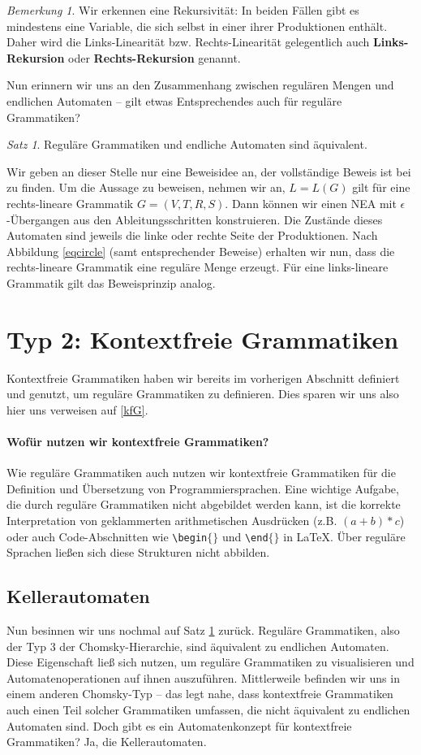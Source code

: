 \documentclass[11pt,a4paper]{scrreport}
\theoremstyle{remark}
\newtheorem{note}{Bemerkung}
\theoremstyle{custom}
\newtheorem{satz}{Satz}[section]
\begin{document}
\begin{note}
Wir erkennen eine Rekursivität: In beiden Fällen gibt es mindestens eine Variable, die sich selbst in einer ihrer Produktionen enthält. Daher wird die Links-Linearität bzw. Rechts-Linearität gelegentlich auch \textbf{Links-Rekursion} oder \textbf{Rechts-Rekursion} genannt.
\end{note}
Nun erinnern wir uns an den Zusammenhang zwischen regulären Mengen und endlichen Automaten -- gilt etwas Entsprechendes auch für reguläre Grammatiken?
\begin{satz} \label{eqSatz}
Reguläre Grammatiken und endliche Automaten sind äquivalent.
\end{satz}
Wir geben an dieser Stelle nur eine Beweisidee an, der vollständige Beweis ist bei \parencite[][S. 228]{Hopcroft} zu finden. Um die Aussage zu beweisen, nehmen wir an, $L = L(G)$ gilt für eine rechts-lineare Grammatik $G = (V, T, R, S)$. Dann können wir einen NEA mit $\epsilon$-Übergangen aus den Ableitungsschritten konstruieren. Die Zustände dieses Automaten sind jeweils die linke oder rechte Seite der Produktionen. Nach Abbildung \ref{eqcircle} (samt entsprechender Beweise) erhalten wir nun, dass die rechts-lineare Grammatik eine reguläre Menge erzeugt. Für eine links-lineare Grammatik gilt das Beweisprinzip analog.
\section{Typ 2: Kontextfreie Grammatiken}
Kontextfreie Grammatiken haben wir bereits im vorherigen Abschnitt definiert und genutzt, um reguläre Grammatiken zu definieren. Dies sparen wir uns also hier uns verweisen auf \ref{kfG}.
\paragraph{Wofür nutzen wir kontextfreie Grammatiken?} Wie reguläre Grammatiken auch nutzen wir kontextfreie Grammatiken für die Definition und Übersetzung von Programmiersprachen. Eine wichtige Aufgabe, die durch reguläre Grammatiken nicht abgebildet werden kann, ist die korrekte Interpretation von geklammerten arithmetischen Ausdrücken (z.B. $(a + b ) * c$) oder auch Code-Abschnitten wie \texttt{{\textbackslash}begin$\lbrace \rbrace$} und \texttt{{\textbackslash}end$\lbrace \rbrace$} in {\LaTeX}. Über reguläre Sprachen ließen sich diese Strukturen nicht abbilden. \parencite[vgl. ][S. 81]{Hopcroft}
\subsection{Kellerautomaten}
Nun besinnen wir uns nochmal auf Satz \ref{eqSatz} zurück. Reguläre Grammatiken, also der Typ 3 der Chomsky-Hierarchie, sind äquivalent zu endlichen Automaten. Diese Eigenschaft ließ sich nutzen, um reguläre Grammatiken zu visualisieren und Automatenoperationen auf ihnen auszuführen. Mittlerweile befinden wir uns in einem anderen Chomsky-Typ -- das legt nahe, dass kontextfreie Grammatiken auch einen Teil solcher Grammatiken umfassen, die nicht äquivalent zu endlichen Automaten sind. Doch gibt es ein Automatenkonzept für kontextfreie Grammatiken? Ja, die Kellerautomaten.
\end{document}
